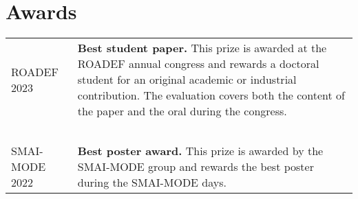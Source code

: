 \section{Awards}

\begin{longtable}[l]{@{}p{}p{}}
    ROADEF 2023 & \textbf{Best student paper.} This prize is awarded at the ROADEF annual congress and rewards a doctoral student for an original academic or industrial contribution. The evaluation covers both the content of the paper and the oral during the congress. \\~\\
    SMAI-MODE 2022 & \textbf{Best poster award.} This prize is awarded by the SMAI-MODE group and rewards the best poster during the SMAI-MODE days. \\
\end{longtable}